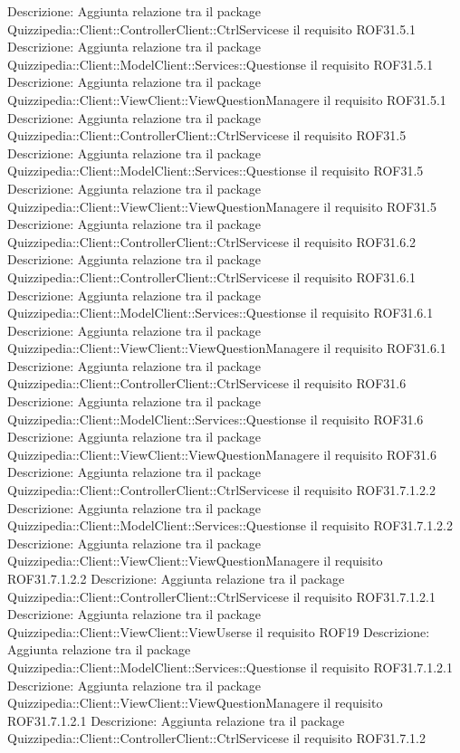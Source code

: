 Descrizione: Aggiunta relazione tra il package Quizzipedia::Client::ControllerClient::CtrlServicese il requisito ROF31.5.1 
Descrizione: Aggiunta relazione tra il package Quizzipedia::Client::ModelClient::Services::Questionse il requisito ROF31.5.1 
Descrizione: Aggiunta relazione tra il package Quizzipedia::Client::ViewClient::ViewQuestionManagere il requisito ROF31.5.1 
Descrizione: Aggiunta relazione tra il package Quizzipedia::Client::ControllerClient::CtrlServicese il requisito ROF31.5 
Descrizione: Aggiunta relazione tra il package Quizzipedia::Client::ModelClient::Services::Questionse il requisito ROF31.5 
Descrizione: Aggiunta relazione tra il package Quizzipedia::Client::ViewClient::ViewQuestionManagere il requisito ROF31.5 
Descrizione: Aggiunta relazione tra il package Quizzipedia::Client::ControllerClient::CtrlServicese il requisito ROF31.6.2 
Descrizione: Aggiunta relazione tra il package Quizzipedia::Client::ControllerClient::CtrlServicese il requisito ROF31.6.1 
Descrizione: Aggiunta relazione tra il package Quizzipedia::Client::ModelClient::Services::Questionse il requisito ROF31.6.1 
Descrizione: Aggiunta relazione tra il package Quizzipedia::Client::ViewClient::ViewQuestionManagere il requisito ROF31.6.1 
Descrizione: Aggiunta relazione tra il package Quizzipedia::Client::ControllerClient::CtrlServicese il requisito ROF31.6 
Descrizione: Aggiunta relazione tra il package Quizzipedia::Client::ModelClient::Services::Questionse il requisito ROF31.6 
Descrizione: Aggiunta relazione tra il package Quizzipedia::Client::ViewClient::ViewQuestionManagere il requisito ROF31.6 
Descrizione: Aggiunta relazione tra il package Quizzipedia::Client::ControllerClient::CtrlServicese il requisito ROF31.7.1.2.2 
Descrizione: Aggiunta relazione tra il package Quizzipedia::Client::ModelClient::Services::Questionse il requisito ROF31.7.1.2.2 
Descrizione: Aggiunta relazione tra il package Quizzipedia::Client::ViewClient::ViewQuestionManagere il requisito ROF31.7.1.2.2 
Descrizione: Aggiunta relazione tra il package Quizzipedia::Client::ControllerClient::CtrlServicese il requisito ROF31.7.1.2.1 
Descrizione: Aggiunta relazione tra il package Quizzipedia::Client::ViewClient::ViewUserse il requisito ROF19 
Descrizione: Aggiunta relazione tra il package Quizzipedia::Client::ModelClient::Services::Questionse il requisito ROF31.7.1.2.1 
Descrizione: Aggiunta relazione tra il package Quizzipedia::Client::ViewClient::ViewQuestionManagere il requisito ROF31.7.1.2.1 
Descrizione: Aggiunta relazione tra il package Quizzipedia::Client::ControllerClient::CtrlServicese il requisito ROF31.7.1.2 
